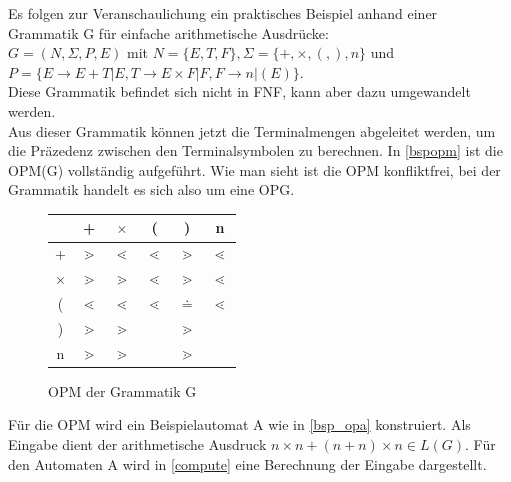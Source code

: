 Es folgen zur Veranschaulichung ein praktisches Beispiel anhand einer Grammatik G für einfache arithmetische Ausdrücke:\\
$G = (N, \Sigma, P, E)$ mit $N= \{E, T, F\}, \Sigma=\{+,\times,(,),n\}$ und\\ $P=\{E \rightarrow E+T | E, T \rightarrow E \times F | F, F \rightarrow n | (E)\}$.\\
Diese Grammatik befindet sich nicht in FNF, kann aber dazu umgewandelt werden.\\
Aus dieser Grammatik können jetzt die Terminalmengen abgeleitet werden, um die Präzedenz zwischen den Terminalsymbolen zu berechnen. In \autoref{bspopm} ist die OPM(G) vollständig aufgeführt. Wie man sieht ist die OPM konfliktfrei, bei der Grammatik handelt es sich also um eine OPG. \\[2ex]
\begin{figure}
\centering
\begin{tabular}[H]{c | c c c c c}

	&	+&	$\times$ &	(&	)&	n	\\ 
\hline
+	& $\gtrdot$	& $\lessdot$	&$\lessdot$	& $\gtrdot$	&$\lessdot$	\\
$\times$ & $\gtrdot$	&$\gtrdot$	&$\lessdot$	&$\gtrdot$	&$\lessdot$	\\
(	&$\lessdot$	&$\lessdot$	&$\lessdot$	& $\doteq$	&$\lessdot$	\\
)	&$\gtrdot$	&$\gtrdot$	&	&$\gtrdot$	&	\\	
n	&$\gtrdot$	&$\gtrdot$	&	&$\gtrdot$	&	\\

\end{tabular}
\caption{OPM der Grammatik G}
\label{bspopm}
\end{figure} 
Für die OPM wird ein Beispielautomat A wie in \autoref{bsp_opa} konstruiert. Als Eingabe dient der arithmetische Ausdruck $n \times n  + (n+n) \times n \in L(G)$. Für den Automaten A wird in \autoref{compute} eine Berechnung der Eingabe dargestellt.

